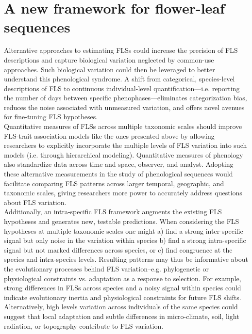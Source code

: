 \documentclass[11pt]{article}
\begin{document}
\section*{A new framework for flower-leaf sequences} 

\noindent Alternative approaches to estimating FLSs could increase the precision of FLS descriptions and capture biological variation neglected by common-use approaches. Such biological variation could then be leveraged to better understand this phenological syndrome. A shift from categorical, species-level descriptions of FLS to continuous individual-level quantification---i.e. reporting the number of days between specific phenophases---eliminates categorization bias, reduces the noise associated with unmeasured variation, and offers novel avenues for fine-tuning FLS hypotheses.\\ 

\noindent  Quantitative measures of FLSs across multiple taxonomic scales should improve FLS-trait association models like the ones presented above by allowing researchers to explicitly incorporate the multiple levels of FLS variation into such models (i.e. through hierarchical modeling). Quantitative measures of phenology \citep[e.g. the BBCH scale,][]{Finn2007} also standardize data across time and space, observer, and analyst. Adopting these alternative measurements in the study of phenological sequences would facilitate comparing FLS patterns across larger temporal, geographic, and taxonomic scales, giving researchers more power to accurately address questions about FLS variation.\\

\noindent Additionally, an intra-specific FLS framework augments the existing FLS hypotheses and generates new, testable predictions. When considering the FLS hypotheses at multiple taxonomic scales one might a) find a strong inter-specific signal but only noise in the variation within species b) find a strong intra-specific signal but not marked differences across species, or c) find congruence at the species and intra-species levels. Resulting patterns may thus be informative about the evolutionary processes behind FLS variation--e.g. phylogenetic or physiological constraints  vs. adaptation as a response to selection. For example, strong differences in FLSs across species and a noisy signal within species could indicate evolutionary inertia and physiological constraints for future FLS shifts. Alternatively, high levels variation across individuals of the same species could suggest that local adaptation and subtle differences in micro-climate, soil, light radiation, or topography contribute to FLS variation.\\ 
\end{document}
